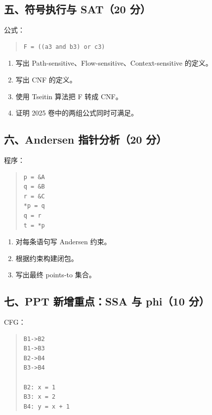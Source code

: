 \documentclass[UTF8,zihao=-4]{ctexart}
\begin{document}
\subsection{五、符号执行与 SAT（20 分）}


公式：


\begin{quote}
\footnotesize
\begin{verbatim}
F = ((a3 and b3) or c3)
\end{verbatim}
\end{quote}


\begin{enumerate}
\item 写出 Path-sensitive、Flow-sensitive、Context-sensitive 的定义。
\item 写出 CNF 的定义。
\item 使用 Tseitin 算法把 F 转成 CNF。
\item 证明 2025 卷中的两组公式同时可满足。
\end{enumerate}


\subsection{六、Andersen 指针分析（20 分）}


程序：


\begin{quote}
\footnotesize
\begin{verbatim}
p = &A
q = &B
r = &C
*p = q
q = r
t = *p
\end{verbatim}
\end{quote}


\begin{enumerate}
\item 对每条语句写 Andersen 约束。
\item 根据约束构建闭包。
\item 写出最终 points-to 集合。
\end{enumerate}


\subsection{七、PPT 新增重点：SSA 与 phi（10 分）}


CFG：

\begin{quote}
\footnotesize
\begin{verbatim}
B1->B2
B1->B3
B2->B4
B3->B4

B2: x = 1
B3: x = 2
B4: y = x + 1
\end{verbatim}
\end{quote}
\end{document}
